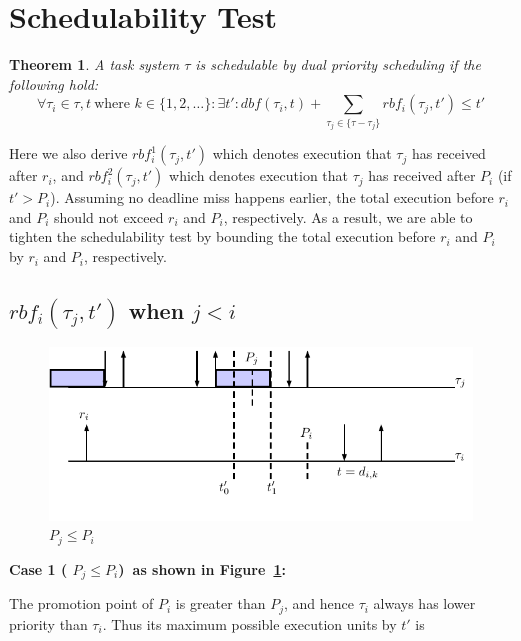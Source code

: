 \documentclass[12pt,conference,onecolumn]{IEEEtran}
\newtheorem{theorem}{Theorem}
\renewcommand{\ae}[1]{{\color{red}{#1}}}
\begin{document}
\section{Schedulability Test}
\begin{theorem}
A task system $\tau$ is schedulable by dual priority scheduling if the following hold:
\begin{equation}
\forall \tau_i\in \tau, t~\mbox{where }k\in\{1,2,\ldots\}: \exists t':
dbf(\tau_i,t)+\sum_{\tau_j\in\{\tau-\tau_j\}}rbf_i(\tau_j,t')\leq t'
\end{equation}
\end{theorem}

Here we also derive $rbf_{i}^1(\tau_j,t')$ which denotes \ae{maximum possible} execution that $\tau_j$ has received after $r_i$,  and $rbf_{i}^2(\tau_j,t')$ which denotes \ae{maximum possible} execution  that $\tau_j$ has received after $P_i$ (if $t'>P_i$).  Assuming no deadline miss happens earlier, the total execution before $r_i$ and $P_i$ should not exceed $r_i$ and $P_i$, respectively. As a result, we are able to tighten the schedulability test by bounding the total execution before $r_i$ and $P_i$ by $r_i$ and $P_i$, respectively.




\subsection{$rbf_i(\tau_j,t')$ when $j<i$}
\begin{figure}[h!]
 \centering
\includegraphics[scale=1]{Figure/C1}  
\caption{$ P_j\leq P_i$}
  \label{fig:case1}
\end{figure}
\textbf{Case 1 ( $P_j\leq P_i$)~as shown in  Figure~\ref{fig:case1}:} 

The promotion point of $P_i$ is greater than $P_j$, and hence $\tau_i$ always has lower priority than $\tau_i$. Thus its maximum possible execution units by $t'$ is 
\end{document}
